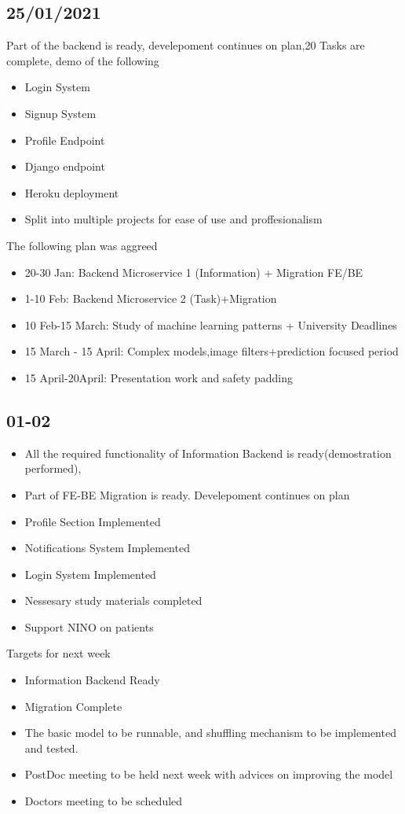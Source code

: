 \documentclass[openany]{article}
\begin{document}
		\subsection{25/01/2021}
			Part of the backend is ready, develepoment continues on plan,20 Tasks are complete, demo of the following
			\begin{itemize}
				\item Login System
				\item Signup System
				\item Profile Endpoint
				\item Django endpoint
				\item Heroku deployment
				\item Split into multiple projects for ease of use and proffesionalism
			\end{itemize}
			The following plan was aggreed
			\begin{itemize}
				\item 20-30 Jan: 				Backend Microservice 1 (Information) + Migration FE/BE
				\item 1-10 Feb:  				Backend Microservice 2 (Task)+Migration
				\item 10 Feb-15 March: 		    Study of machine learning patterns + University Deadlines
				\item 15 March - 15 April:      Complex models,image filters+prediction focused period
				\item 15 April-20April:         Presentation work and safety padding
			\end{itemize}
		\subsection{01-02}
			\begin{itemize}
				\item All the required functionality of Information Backend is ready(demostration performed),
				\item Part of FE-BE Migration is ready. Develepoment continues on plan
				\item Profile Section Implemented
				\item Notifications System Implemented
				\item Login System Implemented
				\item Nessesary study materials completed
				\item Support NINO on patients
			\end{itemize}
			Targets for next week
			\begin{itemize}
				\item Information Backend Ready
				\item Migration Complete
				\item The basic model to be runnable, and shuffling mechanism to be implemented and tested. 
				\item PostDoc meeting to be held next week with advices on improving the model
				\item Doctors meeting to be scheduled
			\end{itemize}
\end{document}
